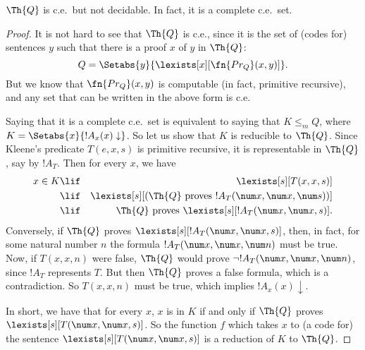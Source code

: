 \documentclass[../../include/open-logic-section]{subfiles}
\begin{document}



\begin{thm}
  $\Th{Q}$ is c.e.\ but not decidable. In fact, it is a complete c.e.\ set.
\end{thm}

\begin{proof}
It is not hard to see that $\Th{Q}$ is c.e., since it is the set of
(codes for) sentences $y$ such that there is a proof $x$ of $y$ in
$\Th{Q}$:
\[
Q = \Setabs{y}{\lexists[x][\fn{Pr_Q}(x,y)]}.
\]
But we know that $\fn{Pr_Q}(x,y)$ is computable (in fact, primitive
recursive), and any set that can be written in the above form is c.e.

Saying that it is a complete c.e.\ set is equivalent to saying that $K
\leq_m Q$, where $K = \Setabs{x}{!A_x(x) \downarrow}$. So let us show
that $K$ is reducible to $\Th{Q}$. Since Kleene's predicate $T(e,x,s)$ is
primitive recursive, it is representable in $\Th{Q}$, say by $!A_T$. Then
for every $x$, we have
\begin{eqnarray*}
x \in K & \lif & \lexists[s][T(x,x,s)] \\
& \lif & \lexists[s][(\text{$\Th{Q}$ proves $!A_T(\num x,\num x, \num s)$})]
  \\
& \lif & \text{$\Th{Q}$ proves $\lexists[s][!A_T(\num x, \num x, s)]$}.
\end{eqnarray*}
Conversely, if $\Th{Q}$ proves $\lexists[s][!A_T(\num x, \num x, s)]$,
then, in fact, for some natural number $n$ the formula $!A_T(\num x,
\num x, \num n)$ must be true.  Now, if $T(x,x,n)$ were false,
$\Th{Q}$ would prove $\lnot !A_T(\num x, \num x, \num n)$, since
$!A_T$ represents $T$.  But then $\Th{Q}$ proves a false formula,
which is a contradiction. So $T(x,x,n)$ must be true, which implies
$!A_x(x) \downarrow$.

In short, we have that for every $x$, $x$ is in $K$ if and only if
$\Th{Q}$ proves $\lexists[s][T(\num x,\num x,s)]$. So the function $f$
which takes $x$ to (a code for) the sentence $\lexists[s][T(\num x,
  \num x, s)]$ is a reduction of $K$ to $\Th{Q}$.
\end{proof}
\end{document}
